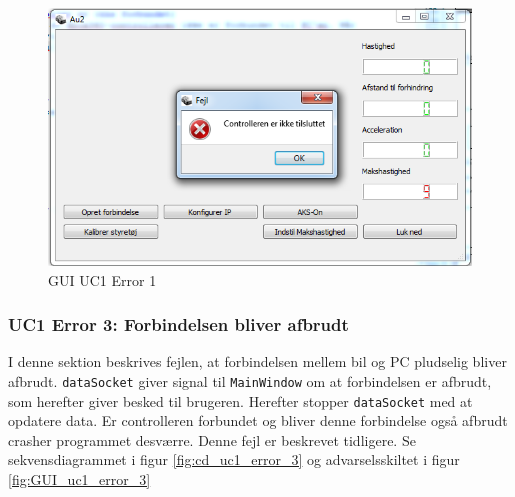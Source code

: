 \begin{figure}[H]
\centering
\includegraphics[width=\textwidth* 3/4,height=\textwidth* 9/20 ]{../fig/billeder/gui_uc1_error_2.png}
\caption{GUI UC1 Error 1}
\label{fig:GUI_uc1_error_2}
\end{figure}

\subsubsection{UC1 Error 3: Forbindelsen bliver afbrudt}
I denne sektion beskrives fejlen, at forbindelsen mellem bil og PC pludselig bliver afbrudt. \texttt{dataSocket} giver signal til \texttt{MainWindow} om at forbindelsen er afbrudt, som herefter giver besked til brugeren. Herefter stopper \texttt{dataSocket} med at opdatere data. Er controlleren forbundet og bliver denne forbindelse også afbrudt crasher programmet desværre. Denne fejl er beskrevet tidligere. Se sekvensdiagrammet i figur \ref{fig:cd_uc1_error_3} og advarselsskiltet i figur \ref{fig:GUI_uc1_error_3} 


